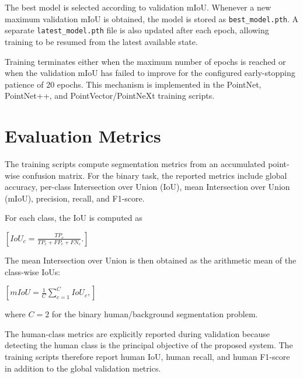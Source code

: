 The best model is selected according to validation mIoU. Whenever a new maximum validation mIoU is obtained, the model is stored as \texttt{best\_model.pth}. A separate \texttt{latest\_model.pth} file is also updated after each epoch, allowing training to be resumed from the latest available state.

Training terminates either when the maximum number of epochs is reached or when the validation mIoU has failed to improve for the configured early-stopping patience of 20 epochs. This mechanism is implemented in the PointNet, PointNet++, and PointVector/PointNeXt training scripts.

\section{Evaluation Metrics}
\label{app:evaluation_metrics}

The training scripts compute segmentation metrics from an accumulated point-wise confusion matrix. For the binary task, the reported metrics include global accuracy, per-class Intersection over Union (IoU), mean Intersection over Union (mIoU), precision, recall, and F1-score.

For each class, the IoU is computed as

$[
IoU_c =
\frac{TP_c}
{TP_c + FP_c + FN_c}.
]$

The mean Intersection over Union is then obtained as the arithmetic mean of the class-wise IoUs:

$[
mIoU =
\frac{1}{C}
\sum_{c=1}^{C} IoU_c,
]$

where $C=2$ for the binary human/background segmentation problem.

The human-class metrics are explicitly reported during validation because detecting the human class is the principal objective of the proposed system. The training scripts therefore report human IoU, human recall, and human F1-score in addition to the global validation metrics.
